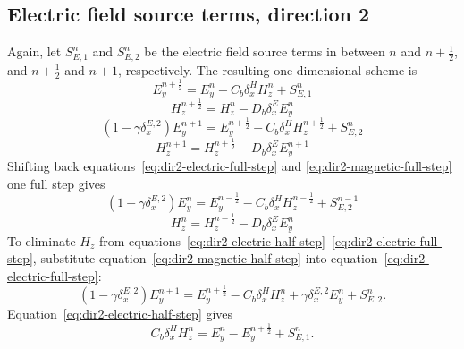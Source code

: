 \documentclass{article}
\numberwithin{figure}{section}
\begin{document}
\subsection{Electric field source terms, direction 2}

Again, let $S_{E,1}^n$ and $S_{E,2}^n$ be the electric field source terms in between $n$ and $n+\frac{1}{2}$, and $n+\frac{1}{2}$ and $n+1$, respectively. The resulting one-dimensional scheme is
\begin{equation}
    E_y^{n+\frac{1}{2}} = E_y^n-C_b\delta_x^H H_z^n+S_{E,1}^n \label{eq:dir2-electric-half-step}
\end{equation}
\begin{equation}
    H_z^{n+\frac{1}{2}} = H_z^n-D_b\delta_x^E E_y^n \label{eq:dir2-magnetic-half-step}
\end{equation}
\begin{equation}
    \left(1-\gamma\delta_x^{E,2}\right)E_y^{n+1} = E_y^{n+\frac{1}{2}}-C_b\delta_x^H H_z^{n+\frac{1}{2}}+S_{E,2}^n \label{eq:dir2-electric-full-step}
\end{equation}
\begin{equation}
    H_z^{n+1} = H_z^{n+\frac{1}{2}}-D_b\delta_x^E E_y^{n+1} \label{eq:dir2-magnetic-full-step}
\end{equation}
Shifting back equations~\eqref{eq:dir2-electric-full-step} and \eqref{eq:dir2-magnetic-full-step} one full step gives
\begin{equation}
    \left(1-\gamma\delta_x^{E,2}\right)E_y^n = E_y^{n-\frac{1}{2}}-C_b\delta_x^H H_z^{n-\frac{1}{2}}+S_{E,2}^{n-1} \label{eq:dir2-shifted-electric-step}
\end{equation}
\begin{equation}
    H_z^n = H_z^{n-\frac{1}{2}}-D_b\delta_x^E E_y^n \label{eq:dir2-shifted-magnetic-step}
\end{equation}
To eliminate $H_z$ from equations~\eqref{eq:dir2-electric-half-step}--\eqref{eq:dir2-electric-full-step}, substitute equation~\eqref{eq:dir2-magnetic-half-step} into equation~\eqref{eq:dir2-electric-full-step}:
\begin{equation}
    \left(1-\gamma\delta_x^{E,2}\right)E_y^{n+1} = E_y^{n+\frac{1}{2}}-C_b\delta_x^H H_z^n+\gamma\delta_x^{E,2}E_y^n+S_{E,2}^n. \label{eq:dir2-e-after-h-substitution}
\end{equation}
Equation~\eqref{eq:dir2-electric-half-step} gives
\begin{equation}
    C_b\delta_x^H H_z^n = E_y^n-E_y^{n+\frac{1}{2}}+S_{E,1}^n. \label{eq:dir2-h-elimination-identity}
\end{equation}
\end{document}
